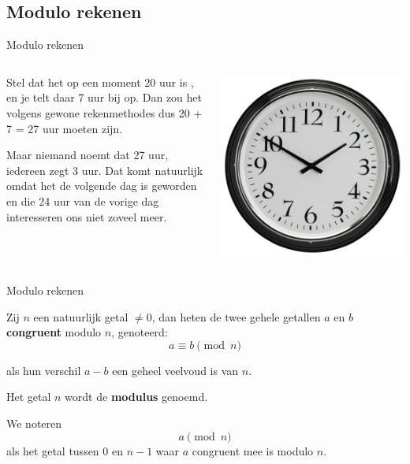 \documentclass{beamer}
\begin{document}
\subsection{Modulo rekenen}
\begin{frame}{Modulo rekenen}
	\begin{columns}
		\begin{column}[T]{0.5\textwidth}
			Stel dat het op een moment 20 uur is , en je telt daar 7 uur bij op. Dan zou het volgens gewone rekenmethodes dus 20 + 7 = 27 uur moeten zijn.
			
			Maar niemand noemt dat 27 uur, iedereen zegt 3 uur. Dat komt natuurlijk omdat het de volgende dag is geworden en die 24 uur van de vorige dag interesseren ons niet zoveel meer.
		\end{column}
		
		\begin{column}[T]{0.5\textwidth}
				\includegraphics[width=\textwidth]{img/clock.jpg}
		\end{column}
	\end{columns}
\end{frame}

\begin{frame}{Modulo rekenen}

	Zij $n$ een natuurlijk getal $\neq 0$, dan heten de twee gehele getallen $a$ en $b$ \textbf{congruent} modulo $n$, genoteerd:
	\[ 
		a \equiv b \pmod{n}
	\]
	
	als hun verschil $a - b$ een geheel veelvoud is van $n$.
	
	Het getal $n$ wordt de \textbf{modulus} genoemd.
	
	We noteren 
	\[
	a \pmod{n} 
	\]
	als het getal tussen $0$ en $n-1$ waar $a$ congruent mee is modulo $n$.
	
\end{frame}
\end{document}
